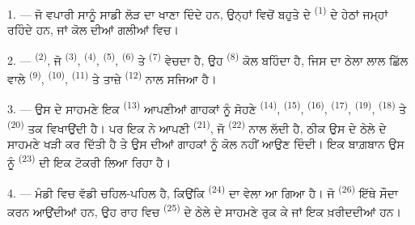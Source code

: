 
\VUsaut{4.0mm}
\VUsaut{3.0mm}

\VUsaut{3.0mm}

1. --- ਜੋ ਵਪਾਰੀ ਸਾਨੂੰ ਸਾਡੀ ਲੋੜ ਦਾ ਖਾਣਾ ਦਿੰਦੇ ਹਨ, ਉਨ੍ਹਾਂ ਵਿਚੋਂ ਬਹੁਤੇ
 ਦੇ  \textsuperscript{(1)} ਦੇ ਹੇਠਾਂ ਜਮ੍ਹਾਂ ਰਹਿੰਦੇ
ਹਨ, ਜਾਂ ਕੋਲ ਦੀਆਂ ਗਲੀਆਂ ਵਿਚ।

2. ---  \textsuperscript{(2)}, ਜੋ 
\textsuperscript{(3)},  \textsuperscript{(4)},
 \textsuperscript{(5)}, 
\textsuperscript{(6)} ਤੇ  \textsuperscript{(7)} ਵੇਚਦਾ ਹੈ, ਉਹ
 \textsuperscript{(8)} ਕੋਲ ਬਹਿੰਦਾ ਹੈ, ਜਿਸ ਦਾ ਠੇਲਾ ਲਾਲ
ਛਿੱਲ ਵਾਲੇ  \textsuperscript{(9)},
 \textsuperscript{(10)}, 
\textsuperscript{(11)} ਤੇ ਤਾਜ਼ੇ  \textsuperscript{(12)} ਨਾਲ
ਸਜਿਆ ਹੈ।

3. --- ਉਸ ਦੇ ਸਾਹਮਣੇ ਇਕ  \textsuperscript{(13)} ਆਪਣੀਆਂ
ਗਾਹਕਾਂ ਨੂੰ ਸੋਹਣੇ  \textsuperscript{(14)}, 
\textsuperscript{(15)},  \textsuperscript{(16)}, 
\textsuperscript{(17)},  \textsuperscript{(19)}, 
\textsuperscript{(18)} ਤੇ  \textsuperscript{(20)} ਤਕ ਵਿਖਾਉਂਦੀ ਹੈ। ਪਰ
ਇਕ  ਨੇ ਆਪਣੀ  \textsuperscript{(21)}, ਜੋ
 \textsuperscript{(22)} ਨਾਲ ਲੱਦੀ ਹੈ, ਠੀਕ ਉਸ ਦੇ ਠੇਲੇ ਦੇ ਸਾਹਮਣੇ
ਖੜੀ ਕਰ ਦਿੱਤੀ ਹੈ ਤੇ ਉਸ ਦੀਆਂ ਗਾਹਕਾਂ ਨੂੰ ਕੋਲ ਨਹੀਂ ਆਉਣ ਦਿੰਦੀ। ਇਕ ਬਾਗ਼ਬਾਨ ਉਸ ਨੂੰ
 \textsuperscript{(23)} ਦੀ ਇਕ ਟੋਕਰੀ ਲਿਆ ਰਿਹਾ ਹੈ।

\VUsaut{4.0mm}
\VUsaut{3.0mm}

4. --- ਮੰਡੀ ਵਿਚ ਵੱਡੀ ਚਹਿਲ-ਪਹਿਲ ਹੈ, ਕਿਉਂਕਿ  \textsuperscript{(24)}
ਦਾ ਵੇਲਾ ਆ ਗਿਆ ਹੈ। ਜੋ  \textsuperscript{(26)} ਇੱਥੇ ਸੌਦਾ ਕਰਨ
ਆਉਂਦੀਆਂ ਹਨ, ਉਹ ਰਾਹ ਵਿਚ  \textsuperscript{(25)} ਦੇ ਠੇਲੇ ਦੇ
ਸਾਹਮਣੇ ਰੁਕ ਕੇ  ਜਾਂ ਇਕ  ਖ਼ਰੀਦਦੀਆਂ ਹਨ।

